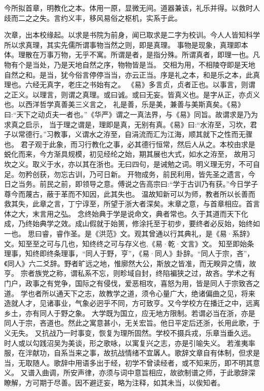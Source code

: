 \documentclass[UTF8]{ctexart}  %
\begin{document}
今所拟首章，明教化之本。体用一原，显微无间。道器兼该，礼乐并得。以救时人歧而二之之失。言约义丰，移风易俗之枢机，实系于此。

次章，出本校缘起。以求是书院为前身，闻已取求是二字为校训。今人人皆知科学所以求真理，其实先儒所谓事物当然之则，即是真理。
事物是现象，真理即本体。理散在万事万物，无乎不寓。所谓是者，是指分殊。所谓真者，即理一也。凡物有个是当处，乃是天地自然之序，物物皆是当。
交相为用，不相陵夺即是天地自然之和。是当，犹今俗言停停当当，亦云正当。序是礼之本，和是乐之本，此真理也。六经无真字，老庄之书始有之。
《易》多言贞，贞者正也。以事言，则谓之正义。以理言，则谓之真理。或曰诚。或曰无妄。皆真义也。是字从正，亦贞义也。以西洋哲学真善美三义言之，
礼是善，乐是美，兼善与美斯真矣。《易》曰:“天下之动贞夫一者也。”《华严》谓之一真法界，与《易》同旨。故谓求是乃为求真之启示，
当于理之谓是，理即是真，无别有真。《易》曰:“水洊至，习坎，君子以常德行。”习教事，义谓水之洊至，自涓流而汇为江海，顺其就下之性而无骤也。
君子观于此象，而习行教化之事，必其德行恒常，然后人从之。本校由求是蜕化而来，今方渐具规模，初见经纶之始，期其展也大式，如水之洊至，
故用习坎之义。取义于水，亦以其在浙也。无曰四句，是诫勉之词。明义理无穷，不可自足。勿矜创获，勿忘古训，乃可日新。
开物成务，前民利用，皆先圣之遗言，今日之当务。前民之前，即领导之意。傅说之告高宗曰:“学于古训乃有获。”今日学子尊今而蔑古，蔽于革而不知因，此其失也。
温故知新可以为师，教者所以长善而救其失，此章之言，丁宁谆至，所望于浙大者深矣。末章之意，与首章相应。首言体之大，末言用之弘。
念终始典于学是说命文，典者常也。久于其道而天下化成，乃终始典学之效。成山假就于始篑，修涂托至于初步，要终者必反始，始终如一也。
思曰睿，睿作圣。是《洪范》文。观其曾通以行其典礼，是《易·系辞》文。知至至之可与几也，知终终之可与存义也,《易·乾·文言》文。
知至即始条理事，知终即终条理事，“同人于野，亨”，《易·同人》卦辞。“同人于宗，吝”，《同人》六二爻辞。野者旷远之地，惟廓然大公，斯放之皆准，而无睽异之情，故亨。
宗者族党之称，谓私系不忘，则畛域自封，终陷褊狭之过，故吝。学术之有门户，政事之有党争，国际之有侵伐，爱恶相攻，喜怒为用，皆是同人于宗致吝之道。
学也者所以通天下之志，故教学之道，须令心量广大，绝诸偏曲之见，将来造就人才，见诸事业，气象必迥乎不同，方可致亨。又今学校方在播迁之中，远离乡土，亦有同人于野之象。
大学既为国立，应无地方限制。若谓必当在浙，亦是同人于宗，吝道也。然此之寓意甚小，无关宏旨。他日平定后还浙，长用此歌，于义无失。
又抗战乃一时事变，恢复为理所固然。学校不摄兵戎，乐章当垂久远。时人或以勾践沼吴为美谈，形之歌咏，以寓复兴之志，亦是引喻失义。
若淮夷率服，在泮献功，自系当来之事，故抗战情绪不宜羼人。歌辞文章自有体制，但求是当，无取随人。歌辞中用语多出于经，初学不曾读经者，或不知来历，即不明其意义。
又谱入曲调，所安声律，亦须与词中意旨相应，故欲制谱之师，于此歌辞深瞭解，方可期于尽善。因不避迂妄，略为注释，如其未当，以俟知者。
\end{document}

